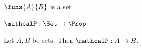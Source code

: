 \begin{signature}\label{set_map_bad_funs}
    $\funs{A}{B}$ is a set.
\end{signature}

\begin{signature}\label{set_map_logical_predicate}
    $\mathcalP : \Set\to\Prop$.
\end{signature}

\begin{axiom}\label{set_map_logical_function}
    Let $A,B$ be sets.
    Then $\mathcalP:A\to B$.
\end{axiom}
